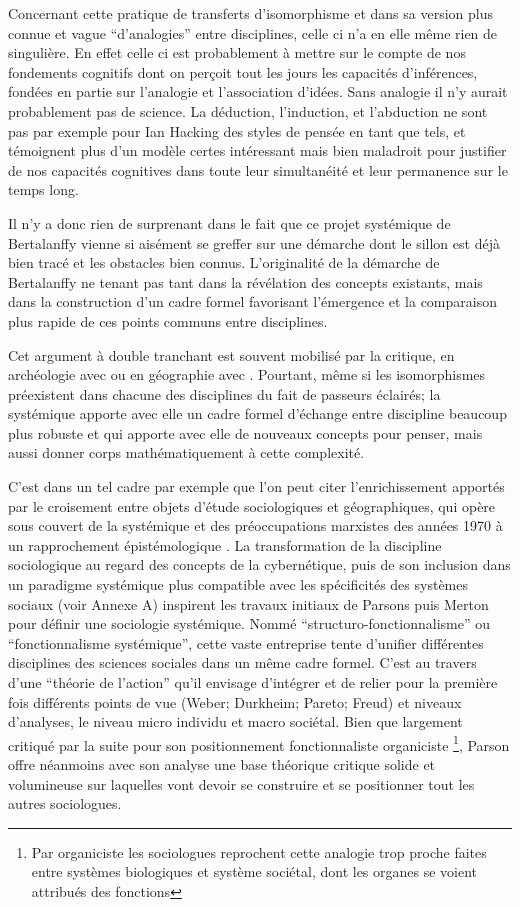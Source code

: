 Concernant cette pratique de transferts d'isomorphisme et dans sa version plus connue et vague \enquote{d'analogies} entre disciplines, celle ci n'a en elle même rien de singulière. En effet celle ci est probablement à mettre sur le compte de nos fondements cognitifs dont on perçoit tout les jours les capacités d'inférences, fondées en partie sur l’analogie et l'association d'idées. Sans analogie il n'y aurait probablement pas de science. La déduction, l'induction, et l'abduction ne sont pas par exemple pour Ian Hacking des styles de pensée en tant que tels, et témoignent plus d'un modèle certes intéressant mais bien maladroit pour justifier de nos capacités cognitives dans toute leur simultanéité et leur permanence sur le temps long.

Il n'y a donc rien de surprenant dans le fait que ce projet systémique de Bertalanffy vienne si aisément se greffer sur une démarche dont le sillon est déjà bien tracé et les obstacles bien connus. L'originalité de la démarche de Bertalanffy ne tenant pas tant dans la révélation des concepts existants, mais dans la construction d'un cadre formel favorisant l'émergence et la comparaison plus rapide de ces points communs entre disciplines.

Cet argument à double tranchant est souvent mobilisé par la critique, en archéologie avec \textcite{Salmon1978} ou en géographie avec \textcite{Chisholm1967}. Pourtant, même si les isomorphismes préexistent dans chacune des disciplines du fait de passeurs éclairés; la systémique apporte avec elle un cadre formel d'échange entre discipline beaucoup plus robuste et qui apporte avec elle de nouveaux concepts pour penser, mais aussi donner corps mathématiquement à cette complexité.

C'est dans un tel cadre par exemple que l'on peut citer l'enrichissement apportés par le croisement entre objets d'étude sociologiques et géographiques, qui opère sous couvert de la systémique et des préoccupations marxistes des années 1970 à un rapprochement épistémologique \autocite{Claval1995}. La transformation de la discipline sociologique au regard des concepts de la cybernétique, puis de son inclusion dans un paradigme systémique plus compatible avec les spécificités des systèmes sociaux (voir Annexe A) inspirent les travaux initiaux de Parsons puis Merton pour définir une sociologie systémique. Nommé \enquote{structuro-fonctionnalisme} ou \enquote{fonctionnalisme systémique}, cette vaste entreprise tente d'unifier différentes disciplines des sciences sociales dans un même cadre formel. C'est au travers d'une \enquote{théorie de l'action}  qu'il envisage d'intégrer et de relier pour la première fois différents points de vue (Weber; Durkheim; Pareto; Freud) et niveaux d'analyses, le niveau micro individu et macro sociétal. Bien que largement critiqué par la suite pour son positionnement fonctionnaliste organiciste \footnote{Par organiciste les sociologues reprochent cette analogie trop proche faites entre systèmes biologiques et système sociétal, dont les organes se voient attribués des fonctions}, Parson offre néanmoins avec son analyse une base théorique critique solide et volumineuse sur laquelles vont devoir se construire et se positionner tout les autres sociologues.

